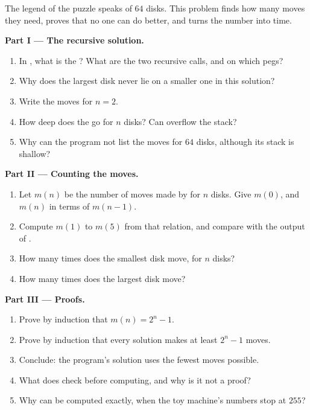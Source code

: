 \begin{problem}\label{pb:g12:recursion:1}
The legend of the puzzle speaks of $64$ disks. This problem finds how many moves they need, proves that no one can do
better, and turns the number into time.

\label{lst:g12:recursion:sixty-four}

\label{out:g12:recursion:sixty-four}

\medskip\noindent\textbf{Part I --- The recursive solution.}
\begin{enumerate}
  \item In , what is the ? What are the two recursive calls, and on which pegs?
  \item Why does the largest disk never lie on a smaller one in this solution?
  \item Write the moves for $n = 2$.
  \item How deep does the  go for $n$ disks? Can  overflow the stack?
  \item Why can the program not list the moves for $64$ disks, although its stack is shallow?
\end{enumerate}

\medskip\noindent\textbf{Part II --- Counting the moves.}
\begin{enumerate}[resume]
  \item Let $m(n)$ be the number of moves made by  for $n$ disks. Give $m(0)$, and $m(n)$ in terms of
    $m(n - 1)$.
  \item Compute $m(1)$ to $m(5)$ from that relation, and compare with the output of .
  \item How many times does the smallest disk move, for $n$ disks?
  \item How many times does the largest disk move?
\end{enumerate}

\medskip\noindent\textbf{Part III --- Proofs.}
\begin{enumerate}[resume]
  \item Prove by induction that $m(n) = 2^n - 1$.
  \item Prove by induction that every solution makes at least $2^n - 1$ moves.
  \item Conclude: the program's solution uses the fewest moves possible.
  \item What does  check before computing, and why is it not a proof?
  \item Why can  be computed exactly, when the toy machine's numbers stop at $255$?
\end{enumerate}


\end{problem}
